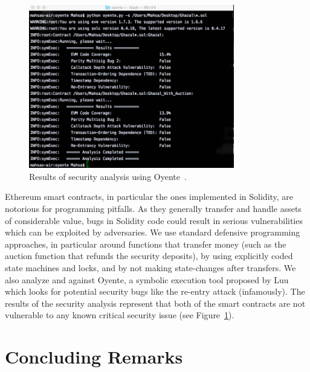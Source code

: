 \begin{figure}[t]
\centering
\includegraphics[width=0.8\textwidth]{fig/GhazalstarOyenteResult.png}
\caption{\footnotesize{Results of \Ghazalstar security analysis using Oyente~\cite{luu2016making}.}\label{fig:oyente}}
\end{figure}

Ethereum smart contracts, in particular the ones implemented in Solidity, are notorious for programming pitfalls. As they generally transfer and handle assets of considerable value, bugs in Solidity code could result in serious vulnerabilities which can be exploited by adversaries. We use standard defensive programming approaches, in particular around functions that transfer money (such as the auction function that refunds the security deposits), by using explicitly coded state machines and locks, and by not making state-changes after transfers. We also analyze \Ghazal and \Ghazalstar against Oyente, a symbolic execution tool proposed by Luu~\etal\cite{luu2016making} which looks for potential security bugs like the re-entry attack (infamously). The results of the security analysis represent that both of the smart contracts are not vulnerable to any known critical security issue (see Figure~\ref{fig:oyente}).


\section{Concluding Remarks}

